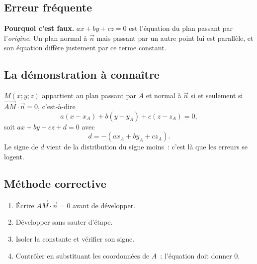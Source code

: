 

\subsection*{Erreur fréquente}


\textbf{Pourquoi c'est faux.} $ax+by+cz=0$ est l'équation du plan passant par
l'\emph{origine}. Un plan normal à $\vec{n}$ mais passant par un autre point
lui est parallèle, et son équation diffère justement par ce terme constant.

\subsection*{La démonstration à connaître}

$M(x;y;z)$ appartient au plan passant par $A$ et normal à $\vec{n}$ si et
seulement si $\vec{AM}\cdot\vec{n}=0$, c'est-à-dire
\[
  a(x-x_A)+b(y-y_A)+c(z-z_A)=0,
\]
soit $ax+by+cz+d=0$ avec
\[
  d=-(a x_A + b y_A + c z_A).
\]
Le signe de $d$ vient de la distribution du signe moins~: c'est là que les
erreurs se logent.

\subsection*{Méthode corrective}

\begin{enumerate}
  \item Écrire $\vec{AM}\cdot\vec{n}=0$ avant de développer.
  \item Développer sans sauter d'étape.
  \item Isoler la constante et vérifier son signe.
  \item Contrôler en substituant les coordonnées de $A$~: l'équation doit
        donner $0$.
\end{enumerate}

